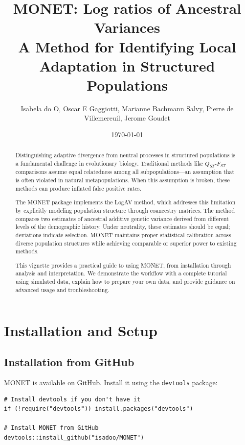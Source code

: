 \documentclass[11pt]{article}
\title{\textbf{MONET: Log ratios of Ancestral Variances} \\
       \large A Method for Identifying Local Adaptation in Structured Populations}
\author{Isabela do O, Oscar E Gaggiotti, Marianne Bachmann Salvy, Pierre de Villemereuil, Jerome Goudet}
\date{\today}
\begin{document}
\maketitle

\begin{abstract}
Distinguishing adaptive divergence from neutral processes in structured populations is a fundamental challenge in evolutionary biology. Traditional methods like $Q_{ST}$-$F_{ST}$ comparisons assume equal relatedness among all subpopulations—an assumption that is often violated in natural metapopulations. When this assumption is broken, these methods can produce inflated false positive rates.

The MONET package implements the LogAV method, which addresses this limitation by explicitly modeling population structure through coancestry matrices. The method compares two estimates of ancestral additive genetic variance derived from different levels of the demographic history. Under neutrality, these estimates should be equal; deviations indicate selection. MONET maintains proper statistical calibration across diverse population structures while achieving comparable or superior power to existing methods.

This vignette provides a practical guide to using MONET, from installation through analysis and interpretation. We demonstrate the workflow with a complete tutorial using simulated data, explain how to prepare your own data, and provide guidance on advanced usage and troubleshooting.
\end{abstract}

\tableofcontents
\newpage

\section{Installation and Setup}

\subsection{Installation from GitHub}

MONET is available on GitHub. Install it using the \texttt{devtools} package:

\lstset{style=Rstyle}
\begin{lstlisting}
# Install devtools if you don't have it
if (!require("devtools")) install.packages("devtools")

# Install MONET from GitHub
devtools::install_github("isadoo/MONET")
\end{lstlisting}
\end{document}
